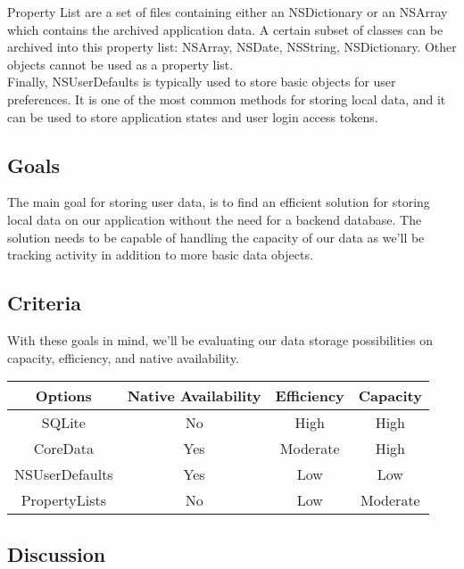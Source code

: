 \documentclass[letterpaper,10pt,titlepage]{article}
\begin{document}
Property List are a set of files containing either an NSDictionary or an NSArray which contains the archived application data. A certain subset of classes can be archived into this property list: NSArray, NSDate, NSString, NSDictionary. Other objects cannot be used as a property list.\\

Finally, NSUserDefaults is typically used to store basic objects for user preferences. It is one of the most common methods for storing local data, and it can be used to store application states and user login access tokens.\cite{dbpara2}\\

\subsection{Goals}

The main goal for storing user data, is to find an efficient solution for storing local data on our application without the need for a backend database. The solution needs to be capable of handling the capacity of our data as we'll be tracking activity in addition to more basic data objects.\\

\subsection{Criteria}

With these goals in mind, we'll be evaluating our data storage possibilities on capacity, efficiency, and native availability.\\

\begin{center}
\begin{tabular}{ |c|c|c|c| }
 \hline
 Options & Native Availability & Efficiency & Capacity \\ \hline
 SQLite & No & High & High \\ \hline
 CoreData & Yes & Moderate & High \\ \hline
 NSUserDefaults & Yes & Low & Low \\ \hline
 PropertyLists & No & Low & Moderate \\ \hline
\end{tabular}
\end{center}

\subsection{Discussion}
\end{document}
